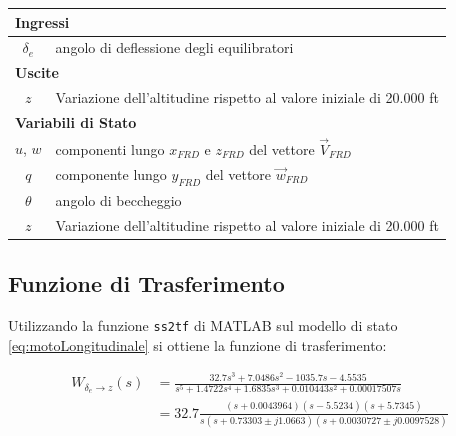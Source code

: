 \renewcommand{\arraystretch}{1.2}
\begin{table}[H]
    \begin{tabularx}{\textwidth}{|c|X|}
        \hline
        \multicolumn{2}{|l|}{\textbf{Ingressi}}                                          \\
        \hline
        $\delta_e$ & angolo di deflessione degli equilibratori                           \\
        \hline
        \multicolumn{2}{|l|}{\textbf{Uscite}}                                            \\
        \hline
        $z$        & Variazione dell'altitudine rispetto al valore iniziale di 20.000 ft \\
        \hline
        \multicolumn{2}{|l|}{\textbf{Variabili di Stato}}                                \\
        \hline
        $u$, $w$   & componenti lungo $x_{FRD}$ e $z_{FRD}$ del vettore $\vec{V}_{FRD}$  \\
        $q$        & componente lungo $y_{FRD}$ del vettore $\vec{w}_{FRD}$              \\
        $\theta$   & angolo di beccheggio                                                \\
        $z$        & Variazione dell'altitudine rispetto al valore iniziale di 20.000 ft \\
        \hline
    \end{tabularx}
\end{table}

\subsection{Funzione di Trasferimento}
Utilizzando la funzione \texttt{ss2tf} di MATLAB sul modello di stato \eqref{eq:motoLongitudinale} si ottiene la funzione di trasferimento:

\begin{equation}
    \label{eq:trasferimentoLongitudinali}
    \begin{split}
        W_{\delta_e \rightarrow z}(s) & = \frac{32.7 s^3 + 7.0486 s^2 - 1035.7 s - 4.5535}{s^5 + 1.4722 s^4 + 1.6835 s^3 + 0.010443 s^2 + 0.00017507 s} \\
                                      & = 32.7\frac{(s + 0.0043964)(s - 5.5234)(s + 5.7345)}{s(s + 0.73303 \pm j1.0663)(s + 0.0030727 \pm j0.0097528)}
    \end{split}
\end{equation}

